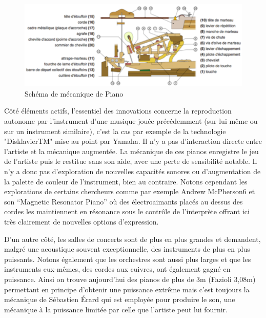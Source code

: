 \documentclass[french,a4paper,12pt]{report}
\begin{document}
	\begin{figure}[!ht]
    \center
    \includegraphics[width=15cm]{MECA_PIANO.png}
    \caption{Schéma de mécanique de Piano}
	\end{figure} 

Côté éléments actifs, l’essentiel des innovations concerne la reproduction autonome par l’instrument d’une musique jouée précédemment (sur lui même ou sur un instrument similaire), c’est la cas par exemple de la technologie "DisklavierTM" mise au point par Yamaha. Il n’y a pas d’interaction directe entre l’artiste et la mécanique augmentée. La mécanique de ces pianos enregistre le jeu de l’artiste puis le restitue sans son aide, avec une
perte de sensibilité notable. Il n’y a donc pas d’exploration de nouvelles capacités sonores ou d’augmentation de la palette de couleur de l’instrument, bien au contraire. Notons cependant les explorations de certains chercheurs comme par exemple Andrew McPherson6 et son “Magnetic Resonator Piano” où des électroaimants placés au dessus des cordes les maintiennent en résonance sous le contrôle de l’interprète offrant ici très clairement de nouvelles options d’expression.

D’un autre côté, les salles de concerts sont de plus en plus grandes et demandent, malgré une acoustique souvent exceptionnelle, des instruments de plus en plus puissants. Notons également que les orchestres sont aussi plus larges et que les instruments eux-mêmes, des cordes aux cuivres, ont également gagné en puissance. Ainsi on trouve aujourd’hui des pianos de plus de 3m (Fazioli 3,08m) permettant en principe d’obtenir une puissance extrême mais
c’est toujours la mécanique de Sébastien Érard qui est employée pour produire le son, une mécanique à la puissance limitée par celle que l’artiste peut lui fournir.
\end{document}
